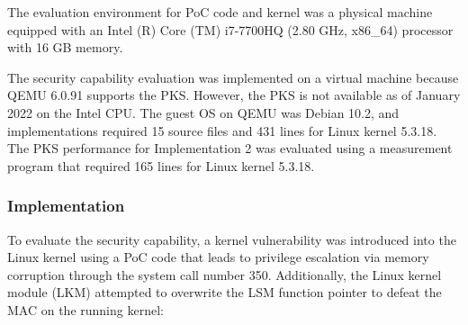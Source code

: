 %
The evaluation environment for PoC code and kernel was a physical machine
equipped with an Intel (R) Core (TM) i7-7700HQ (2.80 GHz, x86\_64) processor
with 16 GB memory.
%
%

The security capability evaluation was implemented on a virtual machine because
QEMU 6.0.91 supports the PKS. However, the PKS is not available as of January
2022 on the Intel CPU.
%
The guest OS on QEMU was Debian 10.2, and implementations required 15 source
files and 431 lines for Linux kernel 5.3.18.
%
The PKS performance for Implementation 2 was evaluated using a
measurement program that required 165 lines for Linux kernel 5.3.18.



\subsubsection{Implementation}
%
%
To evaluate the security capability, a kernel vulnerability was introduced into
the Linux kernel using a PoC code \cite{CVE-2017-16995} that leads to privilege
escalation via memory corruption through the system call number 350.
%
Additionally, the Linux kernel module (LKM) attempted to overwrite the LSM function pointer to
defeat the MAC on the running kernel:

